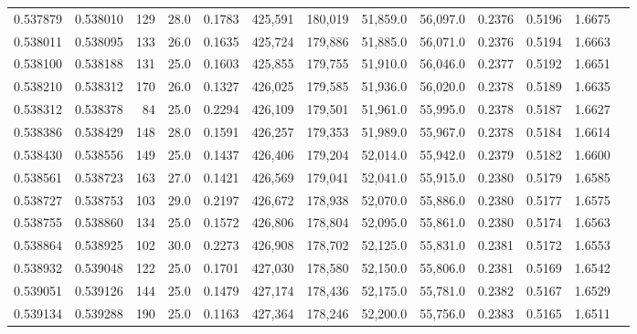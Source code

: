 \begin{tabular}{rrrrrrrrrrrrr}
0.537879 & 0.538010 &   129 & 28.0 &                                     0.1783 & 425,591 & 180,019 &  51,859.0 &  56,097.0 & 0.2376 & 0.5196 & 1.6675 \\
0.538011 & 0.538095 &   133 & 26.0 &                                     0.1635 & 425,724 & 179,886 &  51,885.0 &  56,071.0 & 0.2376 & 0.5194 & 1.6663 \\
0.538100 & 0.538188 &   131 & 25.0 &                                     0.1603 & 425,855 & 179,755 &  51,910.0 &  56,046.0 & 0.2377 & 0.5192 & 1.6651 \\
0.538210 & 0.538312 &   170 & 26.0 &                                     0.1327 & 426,025 & 179,585 &  51,936.0 &  56,020.0 & 0.2378 & 0.5189 & 1.6635 \\
0.538312 & 0.538378 &    84 & 25.0 &                                     0.2294 & 426,109 & 179,501 &  51,961.0 &  55,995.0 & 0.2378 & 0.5187 & 1.6627 \\
0.538386 & 0.538429 &   148 & 28.0 &                                     0.1591 & 426,257 & 179,353 &  51,989.0 &  55,967.0 & 0.2378 & 0.5184 & 1.6614 \\
0.538430 & 0.538556 &   149 & 25.0 &                                     0.1437 & 426,406 & 179,204 &  52,014.0 &  55,942.0 & 0.2379 & 0.5182 & 1.6600 \\
0.538561 & 0.538723 &   163 & 27.0 &                                     0.1421 & 426,569 & 179,041 &  52,041.0 &  55,915.0 & 0.2380 & 0.5179 & 1.6585 \\
0.538727 & 0.538753 &   103 & 29.0 &                                     0.2197 & 426,672 & 178,938 &  52,070.0 &  55,886.0 & 0.2380 & 0.5177 & 1.6575 \\
0.538755 & 0.538860 &   134 & 25.0 &                                     0.1572 & 426,806 & 178,804 &  52,095.0 &  55,861.0 & 0.2380 & 0.5174 & 1.6563 \\
0.538864 & 0.538925 &   102 & 30.0 &                                     0.2273 & 426,908 & 178,702 &  52,125.0 &  55,831.0 & 0.2381 & 0.5172 & 1.6553 \\
0.538932 & 0.539048 &   122 & 25.0 &                                     0.1701 & 427,030 & 178,580 &  52,150.0 &  55,806.0 & 0.2381 & 0.5169 & 1.6542 \\
0.539051 & 0.539126 &   144 & 25.0 &                                     0.1479 & 427,174 & 178,436 &  52,175.0 &  55,781.0 & 0.2382 & 0.5167 & 1.6529 \\
0.539134 & 0.539288 &   190 & 25.0 &                                     0.1163 & 427,364 & 178,246 &  52,200.0 &  55,756.0 & 0.2383 & 0.5165 & 1.6511 \\

\end{tabular}
